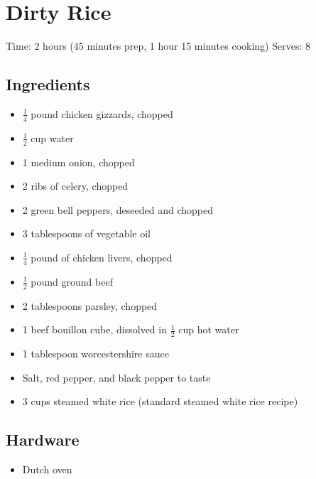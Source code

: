 \section{Dirty Rice}
\label{dirtyRice}
\setcounter{secnumdepth}{0}
Time: 2 hours (45 minutes prep, 1 hour 15 minutes cooking)
Serves: 8

\begin{multicols}{2}
\subsection*{Ingredients}
\begin{itemize}
    \item \( \frac{1}{4} \) pound chicken gizzards, chopped
    \item \( \frac{1}{2} \) cup water
    \item 1 medium onion, chopped
    \item 2 ribs of celery, chopped
    \item 2 green bell peppers, deseeded and chopped
    \item 3 tablespoons of vegetable oil
    \item \( \frac{1}{4} \) pound of chicken livers, chopped
    \item \( \frac{1}{2} \) pound ground beef
    \item 2 tablespoons parsley, chopped
    \item 1 beef bouillon cube, dissolved in \( \frac{1}{2} \) cup hot water
    \item 1 tablespoon worcestershire sauce
    \item Salt, red pepper, and black pepper to taste
    \item 3 cups steamed white rice (standard steamed white rice recipe)
\end{itemize}

\subsection*{Hardware}
\begin{itemize}
    \item Dutch oven
\end{itemize}
\clearpage


\end{multicols}
